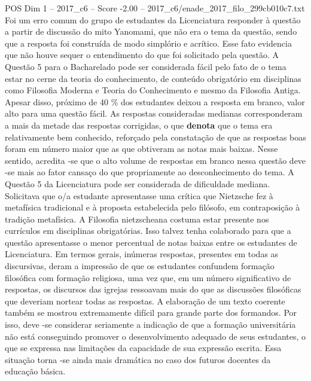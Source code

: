 \begin{textsample}{POS Dim 1 – 2017\_c6 – Score -2.00 – 2017\_c6/enade\_2017\_filo\_299cb010c7.txt}
Foi um erro comum do grupo de estudantes da Licenciatura responder à questão a partir de discussão do mito Yanomami, que não era o tema da questão, sendo que a resposta foi construída de modo simplório e acrítico.
Esse fato evidencia que não houve sequer o entendimento do que foi solicitado pela questão.
A Questão 5 para o Bacharelado pode ser considerada fácil pelo fato de o tema estar no cerne da teoria do conhecimento, de conteúdo obrigatório em disciplinas como Filosofia Moderna e Teoria do Conhecimento e mesmo da Filosofia Antiga.
Apesar disso, próximo de 40 \% dos estudantes deixou a resposta em branco, valor alto para uma questão fácil.
As respostas consideradas medianas corresponderam a mais da metade das respostas corrigidas, o que \textbf{denota} que o tema era relativamente bem conhecido, reforçado pela constatação de que as respostas boas foram em número maior que as que obtiveram as notas mais baixas.
Nesse sentido, acredita -se que o alto volume de respostas em branco nessa questão deve -se mais ao fator cansaço do que propriamente ao desconhecimento do tema.
A Questão 5 da Licenciatura pode ser considerada de dificuldade mediana.
Solicitava que o/a estudante apresentasse uma crítica que Nietzsche fez à metafísica tradicional e à proposta estabelecida pelo filósofo, em contraposição à tradição metafísica.
A Filosofia nietzscheana costuma estar presente nos currículos em disciplinas obrigatórias.
Isso talvez tenha colaborado para que a questão apresentasse o menor percentual de notas baixas entre os estudantes de Licenciatura.
Em termos gerais, inúmeras respostas, presentes em todas as discursivas, deram a impressão de que os estudantes confundem formação filosófica com formação religiosa, uma vez que, em um número significativo de respostas, os discursos das igrejas ressoavam mais do que as discussões filosóficas que deveriam nortear todas as respostas.
A elaboração de um texto coerente também se mostrou extremamente difícil para grande parte dos formandos.
Por isso, deve -se considerar seriamente a indicação de que a formação universitária não está conseguindo promover o desenvolvimento adequado de seus estudantes, o que se expressa nas limitações da capacidade de sua expressão escrita.
Essa situação torna -se ainda mais dramática no caso dos futuros docentes da educação básica.

\end{textsample}
